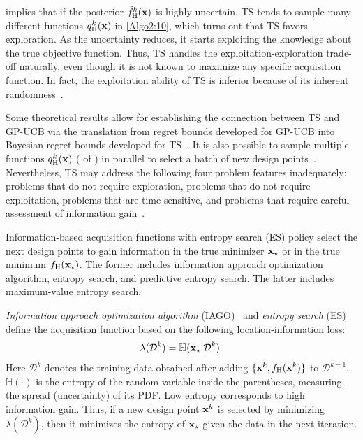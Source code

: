 \documentclass[iicol,sn-basic]{sn-jnl}%
\begin{document}
 implies that if the posterior $\hat{f}_\text{H}^k({\bf x})$ is highly uncertain, TS tends to sample many different functions $q_\text{H}^k({\bf x})$ in \cref{Algo2:10}, which turns out that TS favors exploration.
As the uncertainty reduces, it starts exploiting the knowledge about the true objective function.
Thus, TS handles the exploitation-exploration trade-off naturally, even though it is not known to maximize any specific acquisition function. 
In fact, the exploitation ability of TS is inferior because of its inherent randomness~\citep{Scott2010}.

Some theoretical results allow for establishing the connection between TS and GP-UCB via the translation from regret bounds developed for GP-UCB into Bayesian regret bounds developed for TS~\citep{Russo2014}.
It is also possible to sample multiple functions $q_\text{H}^k({\bf x})$ ( of ) in parallel to select a batch of new design points~\citep{Kandasamy2018}.
Nevertheless, TS may address the following four problem features inadequately: problems that do not require exploration, problems that do not require exploitation, problems that are time-sensitive, and problems that require careful assessment of information gain~\citep{Russo2018}.

Information-based acquisition functions with entropy search (ES) policy select the next design points to gain information in the true minimizer ${\bf x}_\star$ or in the true minimum $f_\text{H}({\bf x}_\star)$.
The former includes information approach optimization algorithm, entropy search, and predictive entropy search.
The latter includes maximum-value entropy search.

\textit{Information approach optimization algorithm} (IAGO)~\citep{Villemonteix2009} and \textit{entropy search} (ES)~\citep{Hennig2012} define the acquisition function based on the following location-information loss:
\begin{equation}\label{eqn43}
	\lambda(\mathcal{D}^{k}) = \mathbb{H}({\bf x}_\star|\mathcal{D}^{k}).
\end{equation}
Here $\mathcal{D}^{k}$ denotes the training data obtained after adding $\{{\bf x}^k,f_\text{H}({\bf x}^k)\}$ to $\mathcal{D}^{k-1}$.
$\mathbb{H}(\cdot)$ is the entropy of the random variable inside the parentheses, measuring the spread (uncertainty) of its PDF.
Low entropy corresponds to high information gain.
Thus, if a new design point ${\bf x}^k$ is selected by minimizing $\lambda(\mathcal{D}^{k})$, then it minimizes the entropy of ${\bf x}_\star$ given the data in the next iteration. 
\end{document}
